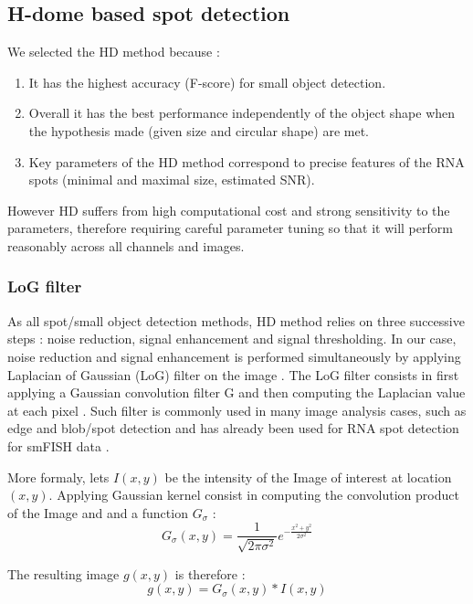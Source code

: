 \documentclass[12pt]{article}
\begin{document}
\subsection{H-dome based spot detection}

We selected the HD method because :
\begin{enumerate}
\item It has the highest accuracy (F-score) for small object detection.
\item Overall it has the best performance independently of the object shape when the hypothesis made (given size and circular shape) are met.
\item Key parameters of the HD method correspond to precise features of the RNA spots (minimal and maximal size, estimated SNR).
\end{enumerate}

However HD suffers from high computational cost and strong sensitivity to the parameters, therefore requiring careful parameter tuning so that it will perform reasonably across all channels and images. 


\subsubsection{LoG filter}

As all spot/small object detection methods, HD method relies on three successive steps : noise reduction, signal enhancement and signal thresholding.
In our case, noise reduction and signal enhancement is performed simultaneously by applying Laplacian of Gaussian (LoG) filter on the image \citep{sponton_review_2015}. The LoG filter consists in first applying a Gaussian convolution filter G and then computing the Laplacian value at each pixel \citep{sponton_review_2015}. Such filter is commonly used in many image analysis cases, such as edge and blob/spot detection and has already been used for RNA spot detection for smFISH data \citep{mueller_fish-quant:_2013}.

More formaly, lets $I(x,y)$ be the intensity of the Image of interest at location $(x,y)$. Applying Gaussian kernel consist in computing the convolution product of the Image and and a function $G_{\sigma}$ :
\begin{equation}
G_{\sigma}(x,y) = \frac{1}{\sqrt{2 \pi \sigma^2}} e^{-\frac{x^2+y^2}{2\sigma^2}}
\end{equation} 

The resulting image $g(x,y)$ is therefore :
\begin{equation}
g(x,y) = G_{\sigma}(x,y)*I(x,y)
\end{equation}
\end{document}
